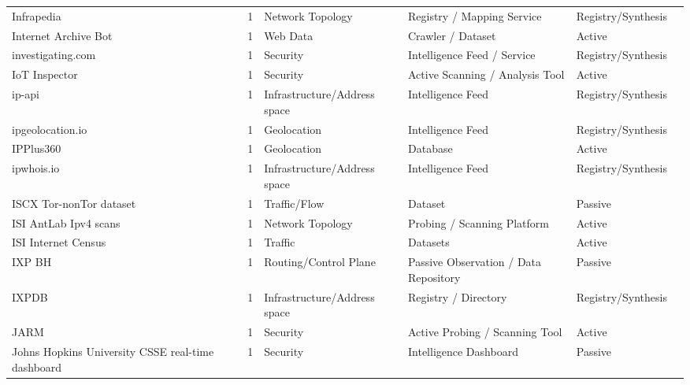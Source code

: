 \begin{table}[h!]
\begin{tabular}{lllllll}
Infrapedia & \cite{infrapedia} & 1 & Network Topology & Registry / Mapping Service & Registry/Synthesis & \cite{10.1007/978-3-030-98785-5_29} \\
Internet Archive Bot & \cite{internet_archive_bot} & 1 & Web Data & Crawler / Dataset & Active & \cite{10.1145/3517745.3561451} \\
investigating.com & \cite{investigating_com} & 1 & Security & Intelligence Feed / Service & Registry/Synthesis & \cite{10.1007/978-3-031-56252-5_3} \\
IoT Inspector & \cite{iot_inspector} & 1 & Security & Active Scanning / Analysis Tool & Active & \cite{10.1145/3618257.3624815} \\
ip-api & \cite{ip_api} & 1 & Infrastructure/Address space & Intelligence Feed & Registry/Synthesis & \cite{10.1007/978-3-030-98785-5_24} \\
ipgeolocation.io & \cite{ipgeolocation} & 1 & Geolocation & Intelligence Feed & Registry/Synthesis & \cite{10.1007/978-3-031-56252-5_11} \\
IPPlus360 & \cite{ipplus} & 1 & Geolocation & Database & Active & \cite{10.1145/3777912.3839813} \\
ipwhois.io & \cite{ipwhois} & 1 & Infrastructure/Address space & Intelligence Feed & Registry/Synthesis & \cite{10.1145/3730567.3764427} \\
ISCX Tor-nonTor dataset & \cite{iscx_tornontor} & 1 & Traffic/Flow & Dataset & Passive & \cite{10.1145/3517745.3561436} \\
ISI AntLab Ipv4 scans & \cite{isi_antlab_ipv4} & 1 & Network Topology & Probing / Scanning Platform & Active & \cite{10.1007/978-3-031-56249-5_8} \\
ISI Internet Census & \cite{10.1145/1452520.1452542} & 1 & Traffic & Datasets & Active & \cite{10.1145/3777912.3839831} \\
IXP BH & \cite{10.1007/978-3-030-72582-2_17} & 1 & Routing/Control Plane & Passive Observation / Data Repository & Passive & \cite{10.1145/3646547.3688451} \\
IXPDB & \cite{iscx_tornontor} & 1 & Infrastructure/Address space & Registry / Directory & Registry/Synthesis & \cite{10.1007/978-3-030-72582-2_14} \\
JARM & \cite{isi_antlab_ipv4} & 1 & Security & Active Probing / Scanning Tool & Active & \cite{10.1007/978-3-031-28486-1_6} \\
Johns Hopkins University CSSE real-time dashboard & \cite{itunes_search_api} & 1 & Security & Intelligence Dashboard & Passive & \cite{10.1145/3487552.3487831} \\

\end{tabular}
\end{table}
